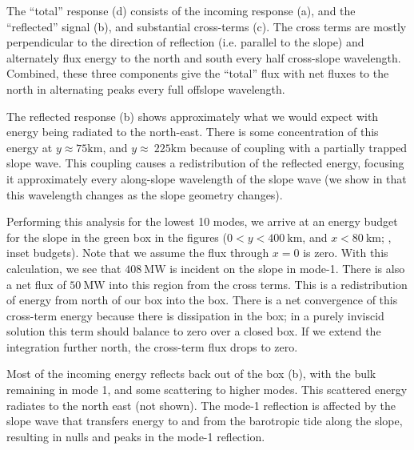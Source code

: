 \documentclass[12pt]{article}
\begin{document}
The ``total'' response (d) consists of the incoming response (a), and the ``reflected'' signal (b), and substantial cross-terms (c).  The cross terms are mostly perpendicular to the direction of reflection (i.e. parallel to the slope) and alternately flux energy to the north and south every half cross-slope wavelength.  Combined, these three components give the ``total'' flux with net fluxes to the north in alternating peaks every full offslope wavelength.  

The reflected response (b) shows approximately what we would expect with energy being radiated to the north-east.  There is some concentration of this energy at $y\approx \mathrm{75 km}$, and  $y\approx\ \mathrm{225 km}$ because of coupling with a partially trapped slope wave.  This coupling causes a redistribution of the reflected energy, focusing it approximately every along-slope wavelength of the slope wave (we show in  that this wavelength changes as the slope geometry changes).  

Performing this analysis for the lowest 10 modes, we arrive at an energy budget for the slope in the green box in the figures ($0<y<400\ \mathrm{km}$, and $x<80\ \mathrm{km}$; , inset budgets).   Note that we assume the flux through $x=0$ is zero.   With this calculation, we see that $408\ \mathrm{MW}$ is incident on the slope in mode-1.  There is also a net flux  of $50\ \mathrm{MW}$ into this region from the cross terms.  This is a redistribution of energy from north of our box into the box.  There is a net convergence of this cross-term energy because there is dissipation in the box; in a purely inviscid solution this term should balance to zero over a closed box.  If we extend the integration further north, the cross-term flux drops to zero.  

Most of the incoming energy reflects back out of the box (b), with the bulk remaining in mode 1, and  some scattering to higher modes.  This scattered energy radiates to the north east (not shown).  The mode-1 reflection is affected by the slope wave that transfers energy to and from the barotropic tide along the slope, resulting in nulls and peaks in the mode-1 reflection.  
\end{document}
